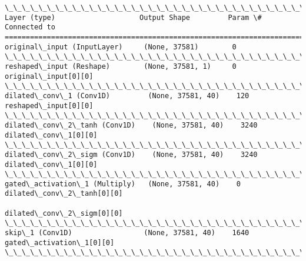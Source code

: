 \documentclass[11pt]{article}
\begin{document}
    \begin{Verbatim}[commandchars=\\\{\}]
\_\_\_\_\_\_\_\_\_\_\_\_\_\_\_\_\_\_\_\_\_\_\_\_\_\_\_\_\_\_\_\_\_\_\_\_\_\_\_\_\_\_\_\_\_\_\_\_\_\_\_\_\_\_\_\_\_\_\_\_\_\_\_\_\_\_\_\_\_\_\_\_\_\_\_\_\_\_\_\_\_\_\_\_\_\_\_\_\_\_\_\_\_\_\_\_\_\_
Layer (type)                    Output Shape         Param \#     Connected to                     
==================================================================================================
original\_input (InputLayer)     (None, 37581)        0                                            
\_\_\_\_\_\_\_\_\_\_\_\_\_\_\_\_\_\_\_\_\_\_\_\_\_\_\_\_\_\_\_\_\_\_\_\_\_\_\_\_\_\_\_\_\_\_\_\_\_\_\_\_\_\_\_\_\_\_\_\_\_\_\_\_\_\_\_\_\_\_\_\_\_\_\_\_\_\_\_\_\_\_\_\_\_\_\_\_\_\_\_\_\_\_\_\_\_\_
reshaped\_input (Reshape)        (None, 37581, 1)     0           original\_input[0][0]             
\_\_\_\_\_\_\_\_\_\_\_\_\_\_\_\_\_\_\_\_\_\_\_\_\_\_\_\_\_\_\_\_\_\_\_\_\_\_\_\_\_\_\_\_\_\_\_\_\_\_\_\_\_\_\_\_\_\_\_\_\_\_\_\_\_\_\_\_\_\_\_\_\_\_\_\_\_\_\_\_\_\_\_\_\_\_\_\_\_\_\_\_\_\_\_\_\_\_
dilated\_conv\_1 (Conv1D)         (None, 37581, 40)    120         reshaped\_input[0][0]             
\_\_\_\_\_\_\_\_\_\_\_\_\_\_\_\_\_\_\_\_\_\_\_\_\_\_\_\_\_\_\_\_\_\_\_\_\_\_\_\_\_\_\_\_\_\_\_\_\_\_\_\_\_\_\_\_\_\_\_\_\_\_\_\_\_\_\_\_\_\_\_\_\_\_\_\_\_\_\_\_\_\_\_\_\_\_\_\_\_\_\_\_\_\_\_\_\_\_
dilated\_conv\_2\_tanh (Conv1D)    (None, 37581, 40)    3240        dilated\_conv\_1[0][0]             
\_\_\_\_\_\_\_\_\_\_\_\_\_\_\_\_\_\_\_\_\_\_\_\_\_\_\_\_\_\_\_\_\_\_\_\_\_\_\_\_\_\_\_\_\_\_\_\_\_\_\_\_\_\_\_\_\_\_\_\_\_\_\_\_\_\_\_\_\_\_\_\_\_\_\_\_\_\_\_\_\_\_\_\_\_\_\_\_\_\_\_\_\_\_\_\_\_\_
dilated\_conv\_2\_sigm (Conv1D)    (None, 37581, 40)    3240        dilated\_conv\_1[0][0]             
\_\_\_\_\_\_\_\_\_\_\_\_\_\_\_\_\_\_\_\_\_\_\_\_\_\_\_\_\_\_\_\_\_\_\_\_\_\_\_\_\_\_\_\_\_\_\_\_\_\_\_\_\_\_\_\_\_\_\_\_\_\_\_\_\_\_\_\_\_\_\_\_\_\_\_\_\_\_\_\_\_\_\_\_\_\_\_\_\_\_\_\_\_\_\_\_\_\_
gated\_activation\_1 (Multiply)   (None, 37581, 40)    0           dilated\_conv\_2\_tanh[0][0]        
                                                                 dilated\_conv\_2\_sigm[0][0]        
\_\_\_\_\_\_\_\_\_\_\_\_\_\_\_\_\_\_\_\_\_\_\_\_\_\_\_\_\_\_\_\_\_\_\_\_\_\_\_\_\_\_\_\_\_\_\_\_\_\_\_\_\_\_\_\_\_\_\_\_\_\_\_\_\_\_\_\_\_\_\_\_\_\_\_\_\_\_\_\_\_\_\_\_\_\_\_\_\_\_\_\_\_\_\_\_\_\_
skip\_1 (Conv1D)                 (None, 37581, 40)    1640        gated\_activation\_1[0][0]         
\_\_\_\_\_\_\_\_\_\_\_\_\_\_\_\_\_\_\_\_\_\_\_\_\_\_\_\_\_\_\_\_\_\_\_\_\_\_\_\_\_\_\_\_\_\_\_\_\_\_\_\_\_\_\_\_\_\_\_\_\_\_\_\_\_\_\_\_\_\_\_\_\_\_\_\_\_\_\_\_\_\_\_\_\_\_\_\_\_\_\_\_\_\_\_\_\_\_

\end{Verbatim}
\end{document}
